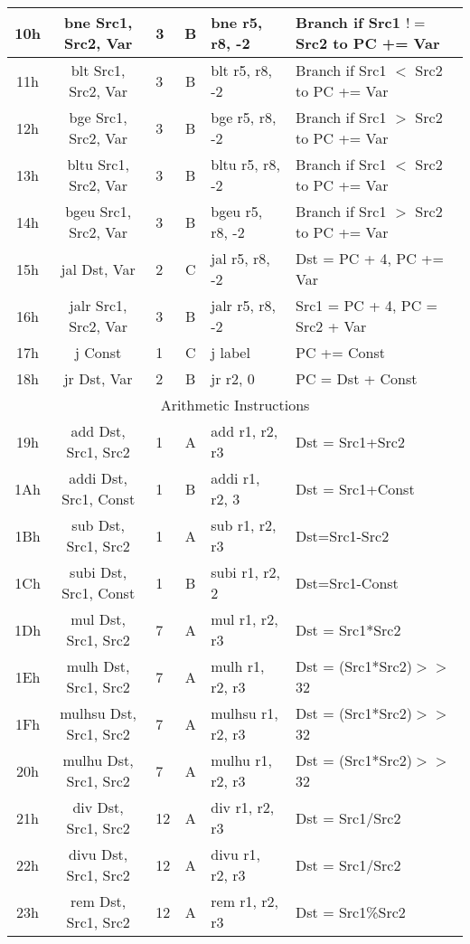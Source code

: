 \documentclass[]{article}
\begin{document}
\begin{longtable}{|c|c|l|c|l|p{5cm}|}
	10h & bne Src1, Src2, Var & 3 & B & bne r5, r8, -2 & Branch if Src1 $!=$ Src2 to PC += Var \\
	\hline
	11h & blt Src1, Src2, Var & 3 & B & blt r5, r8, -2 & Branch if Src1 $<$ Src2 to PC += Var \\
	\hline
	12h & bge Src1, Src2, Var & 3 & B & bge r5, r8, -2 & Branch if Src1 $>$ Src2 to PC += Var \\
	\hline
	13h & bltu Src1, Src2, Var & 3 & B & bltu r5, r8, -2 & Branch if Src1 $<$ Src2 to PC += Var \\
	\hline
	14h & bgeu Src1, Src2, Var & 3 & B & bgeu r5, r8, -2 & Branch if Src1 $>$ Src2 to PC += Var \\
	\hline
	15h & jal Dst, Var & 2 & C & jal r5, r8, -2 & Dst = PC + 4, PC += Var \\
	\hline
	16h & jalr Src1, Src2, Var & 3 & B & jalr r5, r8, -2 & Src1 = PC + 4, PC = Src2 + Var \\
	\hline
	17h & j Const & 1 & C & j label & PC += Const \\
	\hline
	18h & jr Dst, Var & 2 & B & jr r2, 0 & PC = Dst + Const \\
	\hline
	\multicolumn{6}{|c|}{Arithmetic Instructions} \\
	\hline
	19h & add Dst, Src1, Src2 & 1 & A & add r1, r2, r3 & Dst = Src1+Src2 \\
	\hline
	1Ah & addi Dst, Src1, Const & 1 & B & addi r1, r2, 3 & Dst = Src1+Const \\
	\hline
	1Bh & sub Dst, Src1, Src2 & 1 & A & sub r1, r2, r3 & Dst=Src1-Src2 \\
	\hline
	1Ch & subi Dst, Src1, Const & 1 & B & subi r1, r2, 2 & Dst=Src1-Const \\
	\hline
	1Dh & mul Dst, Src1, Src2 & 7 & A & mul r1, r2, r3 & Dst = Src1*Src2 \\
	\hline
	1Eh & mulh Dst, Src1, Src2 & 7 & A & mulh r1, r2, r3 & Dst = (Src1*Src2)$>>$32 \\
	\hline
	1Fh & mulhsu Dst, Src1, Src2 & 7 & A & mulhsu r1, r2, r3 & Dst = (Src1*Src2)$>>$32 \\
	\hline
	20h & mulhu Dst, Src1, Src2 & 7 & A & mulhu r1, r2, r3 & Dst = (Src1*Src2)$>>$32 \\
	\hline
	21h & div Dst, Src1, Src2 & 12 & A & div r1, r2, r3 & Dst = Src1/Src2 \\
	\hline
	22h & divu Dst, Src1, Src2 & 12 & A & divu r1, r2, r3 & Dst = Src1/Src2 \\
	\hline
	23h & rem Dst, Src1, Src2 & 12 & A & rem r1, r2, r3 & Dst = Src1\%Src2 \\

\end{longtable}
\end{document}
